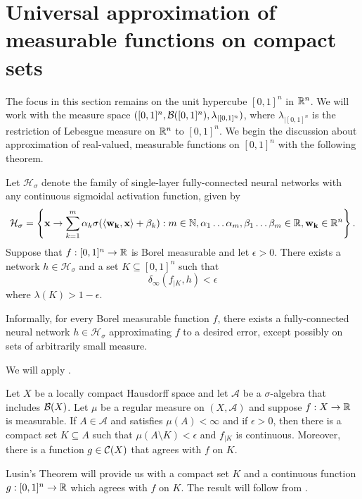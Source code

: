 \section{Universal approximation of measurable functions on compact sets}
\label{section:universality:measurable:compact}
The focus in this section remains on the unit hypercube $[0,1]^n$ in ${\mathbb R}^n$. We will work with the measure space $([0,1]^n, {\mathcal B}([0,1]^n), \lambda_{|[0,1]^n})$, where $\lambda_{|[0,1]^n}$ is the restriction of Lebesgue measure on ${\mathbb R}^n$ to $[0,1]^n$. We begin the discussion about approximation of real-valued, measurable functions on $[0,1]^n$ with the following theorem.
\begin{theorem}
\label{thm:universality:cybenko:measurable}
Let $\mathcal{H}_{\sigma}$ denote the family of single-layer fully-connected neural networks with any continuous sigmoidal activation function, given by \begin{align*}
\mathcal{H}_{\sigma} = \left \{ \mathbf{x} \to \sum_{k=1}^{m} \alpha_k \sigma{\left (\langle \mathbf{w_k}, \mathbf{x} \rangle + \beta_k \right)} : m \in {\mathbb N}, \alpha_1 \ldots \alpha_m, \beta_1 \ldots \beta_m \in {\mathbb R}, \mathbf{w_k} \in {\mathbb R}^n \right \}.
\end{align*}
Suppose that $f : [0,1]^n \to {\mathbb R}$ is Borel measurable and let $\epsilon > 0$. There exists a network $h \in \mathcal{H}_{\sigma}$ and a set $K \subseteq [0,1]^n$ such that \[
    \delta_{\infty}(f_{| K}, h) < \epsilon
\]
where $\lambda(K) > 1 - \epsilon$.
\end{theorem}
Informally, for every Borel measurable function $f$, there exists a fully-connected neural network $h \in \mathcal{H}_{\sigma}$ approximating $f$ to a desired error, except possibly on sets of arbitrarily small measure.

\begin{proof-idea*}
We will apply .
\begin{theorem*}
Let $X$ be a locally compact Hausdorff space and let $\mathcal{A}$ be a $\sigma$-algebra that includes ${\mathcal B}(X)$. Let $\mu$ be a regular measure on $(X, \mathcal{A})$ and suppose $f : X \to {\mathbb R}$ is measurable. If $A \in \mathcal{A}$ and satisfies $\mu(A) < \infty$ and if $\epsilon > 0$, then there is a compact set $K \subseteq A$ such that $\mu(A \setminus K) < \epsilon$ and $f_{|K}$ is continuous. Moreover, there is a function $g \in {\mathcal C}(X)$ that agrees with $f$ on $K$.
\end{theorem*}
Lusin's Theorem will provide us with a compact set $K$ and a continuous function $g : [0,1]^n \to {\mathbb R}$  which agrees with $f$ on $K$. The result will follow from .
\end{proof-idea*}

